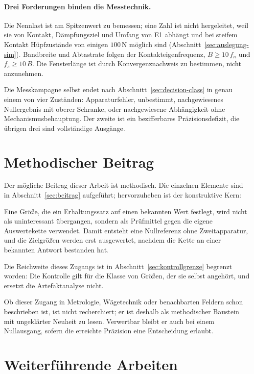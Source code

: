 \documentclass[12pt,a4paper]{report}
\begin{document}
\paragraph{Drei Forderungen binden die Messtechnik.} Die Nennlast ist am
Spitzenwert zu bemessen; eine Zahl ist nicht hergeleitet, weil sie von
Kontakt, Dämpfungsziel und Umfang von E1 abhängt und bei steifem Kontakt
Hüpfzustände von einigen $100\,\mathrm{N}$ möglich sind
(Abschnitt~\ref{sec:auslegung-sim}). Bandbreite und Abtastrate folgen der
Kontakteigenfrequenz, $B \geq 10\,f_n$ und $f_s \geq 10\,B$. Die
Fensterlänge ist durch Konvergenznachweis zu bestimmen, nicht
anzunehmen.

Die Messkampagne selbst endet nach
Abschnitt~\ref{sec:decision-class} in genau einem von vier Zuständen:
Apparaturfehler, unbestimmt, nachgewiesenes Nullergebnis mit oberer
Schranke, oder nachgewiesene Abhängigkeit ohne Mechanismusbehauptung.
Der zweite ist ein bezifferbares Präzisionsdefizit, die übrigen drei
sind vollständige Ausgänge.

\section{Methodischer Beitrag}

Der mögliche Beitrag dieser Arbeit ist methodisch. Die einzelnen
Elemente sind in Abschnitt~\ref{sec:beitrag} aufgeführt; hervorzuheben
ist der konstruktive Kern:

Eine Größe, die ein Erhaltungssatz auf einen bekannten Wert festlegt,
wird nicht als uninteressant übergangen, sondern als Prüfmittel gegen die
eigene Auswertekette verwendet. Damit entsteht eine Nullreferenz ohne
Zweitapparatur, und die Zielgrößen werden erst ausgewertet, nachdem die
Kette an einer bekannten Antwort bestanden hat.

Die Reichweite dieses Zugangs ist in
Abschnitt~\ref{sec:kontrollgrenze} begrenzt worden: Die Kontrolle gilt
für die Klasse von Größen, der sie selbst angehört, und ersetzt die
Artefaktanalyse nicht.

Ob dieser Zugang in Metrologie, Wägetechnik oder benachbarten Feldern
schon beschrieben ist, ist nicht recherchiert; er ist deshalb als
methodischer Baustein mit ungeklärter Neuheit zu lesen. Verwertbar bleibt
er auch bei einem Nullausgang, sofern die erreichte Präzision eine
Entscheidung erlaubt.

\section{Weiterführende Arbeiten}
\label{sec:weiterfuehrend}
\end{document}
